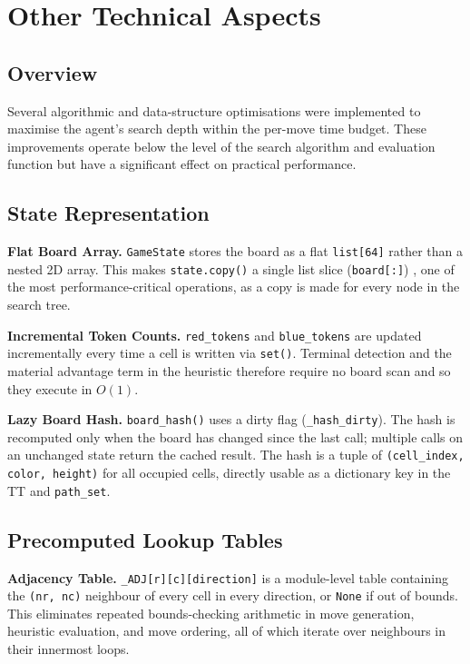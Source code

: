 \documentclass[10.5pt,a4paper]{article}
\begin{document}
\section{Other Technical Aspects}
\label{sec:technical}

\subsection{Overview}

Several algorithmic and data-structure optimisations were implemented to maximise the agent's search depth within the per-move time budget. These improvements operate below the level of the search algorithm and evaluation function but have a significant effect on practical performance.

\subsection{State Representation}

\textbf{Flat Board Array.}
\texttt{GameState} stores the board as a flat \texttt{list[64]} rather than a nested 2D array. This makes \texttt{state.copy()} a single list slice (\texttt{board[:]}) , one of the most performance-critical operations, as a copy is made for every node in the search tree.

\textbf{Incremental Token Counts.}
\texttt{red\_tokens} and \texttt{blue\_tokens} are updated incrementally every time a cell is written via \texttt{set()}. Terminal detection and the material advantage term in the heuristic therefore require no board scan and so they execute in $O(1)$.

\textbf{Lazy Board Hash.}
\texttt{board\_hash()} uses a dirty flag (\texttt{\_hash\_dirty}). The hash is recomputed only when the board has changed since the last call; multiple calls on an unchanged state return the cached result. The hash is a tuple of \texttt{(cell\_index, color, height)} for all occupied cells, directly usable as a dictionary key in the TT and \texttt{path\_set}.

\subsection{Precomputed Lookup Tables}

\textbf{Adjacency Table.}
\texttt{\_ADJ[r][c][direction]} is a module-level table containing the \texttt{(nr, nc)} neighbour of every cell in every direction, or \texttt{None} if out of bounds. This eliminates repeated bounds-checking arithmetic in move generation, heuristic evaluation, and move ordering, all of which iterate over neighbours in their innermost loops.
\end{document}

